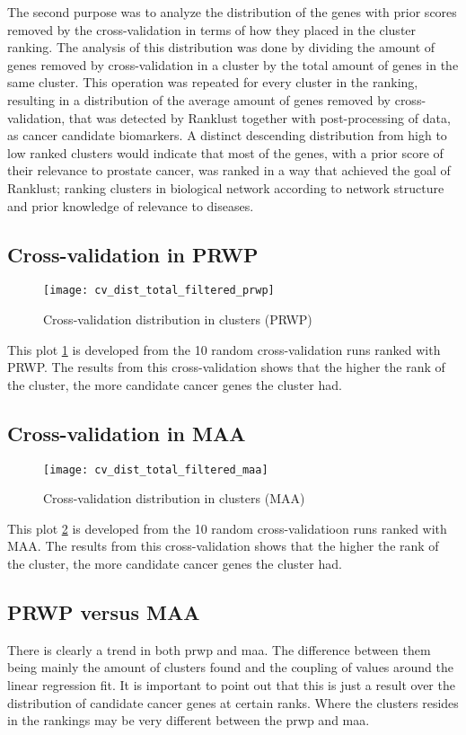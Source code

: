The second purpose was to analyze the distribution of the genes with prior
scores removed by the cross-validation in terms of how they placed in the
cluster ranking. The analysis of this distribution was done by dividing the
amount of genes removed by cross-validation in a cluster by the total amount of
genes in the same cluster. This operation was repeated for every cluster in the
ranking, resulting in a distribution of the average amount of genes removed by
cross-validation, that was detected by Ranklust together with post-processing of
data, as cancer candidate biomarkers. A distinct descending distribution from
high to low ranked clusters would indicate that most of the genes, with a prior
score of their relevance to prostate cancer, was ranked in a way that achieved
the goal of Ranklust; ranking clusters in biological network according to
network structure and prior knowledge of relevance to diseases.

\subsection{Cross-validation in PRWP}
\hspace*{-1cm}\begin{figure}[H]
    \label{fig:irefweb-prwp}
    \texttt{[image: cv\_dist\_total\_filtered\_prwp]}
    \caption{Cross-validation distribution in clusters (PRWP)}
\end{figure}
This plot \ref{fig:irefweb-prwp} is developed from the 10 random
cross-validation runs ranked with PRWP. The results from this cross-validation
shows that the higher the rank of the cluster, the more candidate cancer genes
the cluster had.

\subsection{Cross-validation in MAA}
\hspace*{-1cm}\begin{figure}[H]
    \label{fig:irefweb-maa}
    \texttt{[image: cv\_dist\_total\_filtered\_maa]}
    \caption{Cross-validation distribution in clusters (MAA)}
\end{figure}
This plot \ref{fig:irefweb-maa} is developed from the 10 random
cross-validatioon runs ranked with MAA. The results from this cross-validation
shows that the higher the rank of the cluster, the more candidate cancer genes
the cluster had.

\subsection{PRWP versus MAA}
There is clearly a trend in both \gls{prwp} and \gls{maa}. The difference
between them being mainly the amount of clusters found and the coupling of
values around the linear regression fit. It is important to point out that this
is just a result over the distribution of candidate cancer genes at certain
ranks. Where the clusters resides in the rankings may be very different between
the \gls{prwp} and \gls{maa}.

